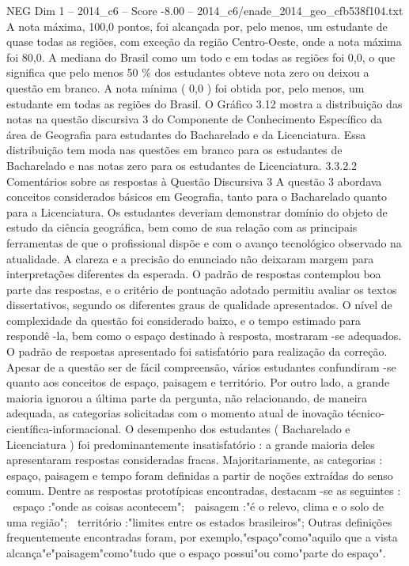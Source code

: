 \begin{textsample}{NEG Dim 1 – 2014\_c6 – Score -8.00 – 2014\_c6/enade\_2014\_geo\_cfb538f104.txt}
A nota máxima, 100,0 pontos, foi alcançada por, pelo menos, um estudante de quase todas as regiões, com exceção da região Centro-Oeste, onde a nota máxima foi 80,0.
A mediana do Brasil como um todo e em todas as regiões foi 0,0, o que significa que pelo menos 50 \% dos estudantes obteve nota zero ou deixou a questão em branco.
A nota mínima ( 0,0 ) foi obtida por, pelo menos, um estudante em todas as regiões do Brasil.
O Gráfico 3.12 mostra a distribuição das notas na questão discursiva 3 do Componente de Conhecimento Específico da área de Geografia para estudantes do Bacharelado e da Licenciatura.
Essa distribuição tem moda nas questões em branco para os estudantes de Bacharelado e nas notas zero para os estudantes de Licenciatura. 3.3.2.2 Comentários sobre as respostas à Questão Discursiva 3 A questão 3 abordava conceitos considerados básicos em Geografia, tanto para o Bacharelado quanto para a Licenciatura.
Os estudantes deveriam demonstrar domínio do objeto de estudo da ciência geográfica, bem como de sua relação com as principais ferramentas de que o profissional dispõe e com o avanço tecnológico observado na atualidade.
A clareza e a precisão do enunciado não deixaram margem para interpretações diferentes da esperada.
O padrão de respostas contemplou boa parte das respostas, e o critério de pontuação adotado permitiu avaliar os textos dissertativos, segundo os diferentes graus de qualidade apresentados.
O nível de complexidade da questão foi considerado baixo, e o tempo estimado para respondê -la, bem como o espaço destinado à resposta, mostraram -se adequados.
O padrão de respostas apresentado foi satisfatório para realização da correção.
Apesar de a questão ser de fácil compreensão, vários estudantes confundiram -se quanto aos conceitos de espaço, paisagem e território.
Por outro lado, a grande maioria ignorou a última parte da pergunta, não relacionando, de maneira adequada, as categorias solicitadas com o momento atual de inovação técnico-científica-informacional.
O desempenho dos estudantes ( Bacharelado e Licenciatura ) foi predominantemente insatisfatório : a grande maioria deles apresentaram respostas consideradas fracas.
Majoritariamente, as categorias : espaço, paisagem e tempo foram definidas a partir de noções extraídas do senso comum.
Dentre as respostas prototípicas encontradas, destacam -se as seguintes :  espaço :"onde as coisas acontecem";  paisagem :"é o relevo, clima e o solo de uma região";  território :"limites entre os estados brasileiros"; Outras definições frequentemente encontradas foram, por exemplo,"espaço"como"aquilo que a vista alcança"e"paisagem"como"tudo que o espaço possui"ou como"parte do espaço".

\end{textsample}
